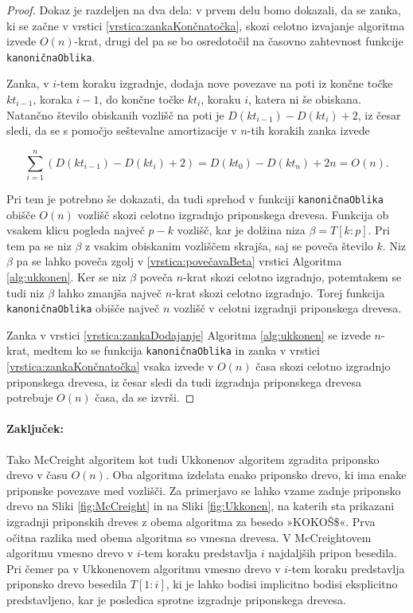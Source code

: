 \begin{proof}

Dokaz je razdeljen na dva dela: v prvem delu bomo dokazali, da se zanka, ki se začne v vrstici \ref{vrstica:zankaKončnatočka}, skozi celotno izvajanje algoritma izvede $O(n)$-krat, drugi del pa se bo osredotočil na časovno zahtevnost funkcije \texttt{kanoničnaOblika}.

Zanka, v $i$-tem koraku izgradnje, dodaja nove povezave na poti iz končne točke $kt_{i-1}$, koraka $i-1$, do končne točke $kt_i$, koraku $i$, katera ni še obiskana. Natančno število obiskanih vozlišč na poti je $D(kt_{i-1})-D(kt_i)+2$, iz česar sledi, da se s pomočjo seštevalne amortizacije v $n$-tih korakih zanka izvede


$$
    \sum_{i=1}^n \left(D(kt_{i-1})-D(kt_i)+2\right)=D(kt_0)-D(kt_n)+2n=O(n).
$$

Pri tem je potrebno še dokazati, da tudi sprehod v funkciji \texttt{kanoničnaOblika} obišče $O(n)$ vozlišč skozi celotno izgradnjo priponskega drevesa. Funkcija ob vsakem klicu pogleda največ $p-k$ vozlišč, kar je dolžina niza $\beta=T[k:p]$. Pri tem pa se niz $\beta$ z vsakim obiskanim vozliščem skrajša, saj se poveča število $k$. Niz $\beta$ pa se lahko poveča zgolj v \ref{vrstica:povečavaBeta} vrstici Algoritma \ref{alg:ukkonen}. Ker se niz $\beta$ poveča $n$-krat skozi celotno izgradnjo, potemtakem se tudi niz $\beta$ lahko zmanjša največ $n$-krat skozi celotno izgradnjo. Torej funkcija \texttt{kanoničnaOblika} obišče največ $n$ vozlišč v celotni izgradnji priponskega drevesa.


Zanka v vrstici \ref{vrstica:zankaDodajanje} Algoritma \ref{alg:ukkonen} se izvede $n$-krat, medtem ko se funkcija \texttt{kanoničnaOblika} in zanka v vrstici \ref{vrstica:zankaKončnatočka} vsaka izvede v $O(n)$ časa skozi celotno izgradnjo priponskega drevesa, iz česar sledi da tudi izgradnja priponskega drevesa potrebuje $O(n)$ časa, da se izvrši.
  
\end{proof}

\paragraph{Zaključek:}
Tako McCreight algoritem \cite{McCreight1976} kot tudi  Ukkonenov algoritem \cite{Ukkonen1995} zgradita priponsko drevo v času $O(n)$. Oba algoritma izdelata enako priponsko drevo, ki ima enake priponske povezave med vozlišči. Za primerjavo se lahko vzame zadnje priponsko drevo na Sliki \ref{fig:McCreight} in na Sliki \ref{fig:Ukkonen}, na katerih sta prikazani izgradnji priponskih dreves z obema algoritma za besedo »KOKOŠ\$«. Prva očitna razlika med obema algoritma so vmesna drevesa. V McCreightovem algoritmu vmesno drevo v $i$-tem koraku predstavlja $i$ najdaljših pripon besedila. Pri čemer pa v Ukkonenovem algoritmu vmesno drevo v $i$-tem koraku predstavlja priponsko drevo besedila $T[1:i]$, ki je lahko bodisi implicitno bodisi eksplicitno predstavljeno, kar je posledica sprotne izgradnje priponskega drevesa.

